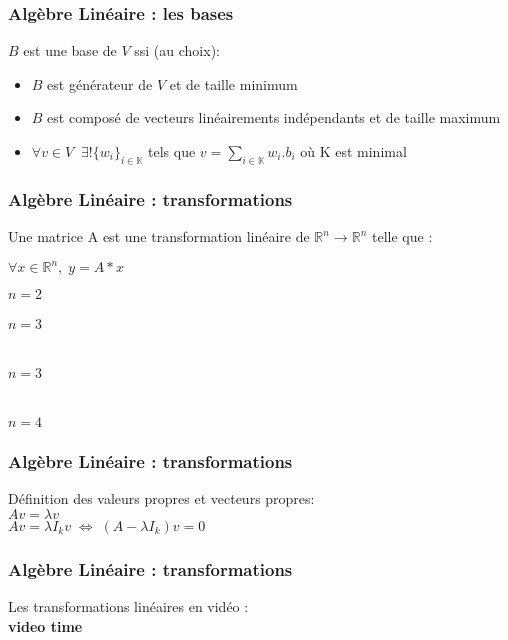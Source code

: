 \documentclass{formation}
\begin{document}
\begin{frame}
  \frametitle{Algèbre Linéaire : les bases}
    $B$ est une base de $V$ ssi (au choix):
    \begin{itemize}
    \item $B$ est générateur de $V$ et de taille minimum
    \item $B$ est composé de vecteurs linéairements indépendants et de taille maximum
    \item $\forall v\in V \;\; \exists! \{{w_i}\}_{i\in\mathbb{K}}$ tels que $v = \sum_{i\in\mathbb{K}} w_i . b_i$ où K est minimal
    \end{itemize}
\end{frame}

\begin{frame}
  \frametitle{Algèbre Linéaire : transformations}
  Une matrice A est une transformation linéaire de $\mathbb{R}^n \rightarrow \mathbb{R}^n$ telle que : 
  \begin{center}
    $\forall x \in \mathbb{R}^n,\;y = A*x$\\
  \end{center}
  \begin{minipage}[r]{0.25\linewidth}
  $n=2$\\
  \\
  $n=3$\\
  \\
  \\
  $n=3$\\
  \\
  \\
  $n=4$\\
  \end{minipage}\hfill
  \begin{minipage}[l]{0.74\linewidth}
  \end{minipage}\hfill
\end{frame}

\begin{frame}
  \frametitle{Algèbre Linéaire : transformations}
  Définition des valeurs propres et vecteurs propres:\\
  $Av = \lambda v$ \\
  $Av = \lambda I_k v \;\iff\; (A-\lambda I_k)v = 0$
\end{frame}

\begin{frame}
  \frametitle{Algèbre Linéaire : transformations}
  Les transformations linéaires en vidéo : \\
             {\textbf{video time}}
\end{frame}
\end{document}
